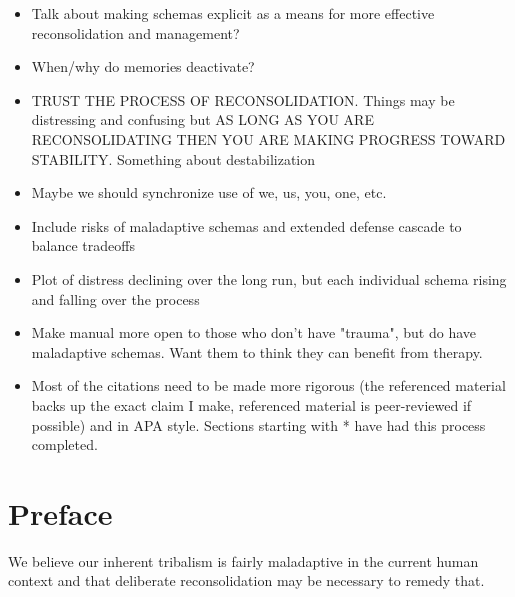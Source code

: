 \documentclass[12pt,letterpaper]{article}
\begin{document}
\begin{itemize}
    \item Talk about making schemas explicit as a means for more effective reconsolidation and management?
    \item When/why do memories deactivate?
    \item TRUST THE PROCESS OF RECONSOLIDATION. Things may be distressing and confusing but AS LONG AS YOU ARE RECONSOLIDATING THEN YOU ARE MAKING PROGRESS TOWARD STABILITY. Something about destabilization
    \item Maybe we should synchronize use of we, us, you, one, etc.
    \item Include risks of maladaptive schemas and extended defense cascade to balance tradeoffs
    \item Plot of distress declining over the long run, but each individual schema rising and falling over the process
    \item Make manual more open to those who don't have "trauma", but do have maladaptive schemas. Want them to think they can benefit from therapy.
    \item Most of the citations need to be made more rigorous (the referenced material backs up the exact claim I make, referenced material is peer-reviewed if possible) and in APA style. Sections starting with * have had this process completed.
\end{itemize}
\section*{Preface}


We believe our inherent tribalism is fairly maladaptive in the current human context and that deliberate reconsolidation may be necessary to remedy that. 
\end{document}
